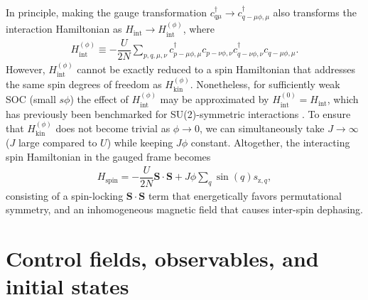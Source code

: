 \documentclass[nofootinbib,twocolumn]{revtex4-2}
\renewcommand{\t}{\text} %
\newcommand{\f}[2]{\dfrac{#1}{#2}} %
\newcommand{\p}[1]{\left(#1\right)} %
\renewcommand{\v}{\bm} %
\renewcommand{\c}{\cdot} %
\newcommand{\1}{\mathds{1}}
\newcommand{\z}{\text{z}}
\begin{document}
In principle, making the gauge transformation $c_{q\mu}^\dag\to c_{q-\mu\phi,\mu}^\dag$ also transforms the interaction Hamiltonian as $H_{\t{int}} \to H_{\t{int}}^{(\phi)}$, where
\begin{align}
  H_{\t{int}}^{(\phi)}
  \equiv -\f{U}{2N} \sum_{p,q,\mu,\nu}
  c_{p-\mu\phi,\mu}^\dag c_{p-\nu\phi,\nu}
  c_{q-\nu\phi,\nu}^\dag c_{q-\mu\phi,\mu}.
\end{align}
However, $H_{\t{int}}^{(\phi)}$ cannot be exactly reduced to a spin Hamiltonian that addresses the same spin degrees of freedom as $H_{\t{kin}}^{(\phi)}$.
Nonetheless, for sufficiently weak SOC (small $s\phi$) the effect of $H_{\t{int}}^{(\phi)}$ may be approximated by $H_{\t{int}}^{(0)}=H_{\t{int}}$, which has previously been benchmarked for SU(2)-symmetric interactions \cite{he2019engineering, smale2019observation}.
To ensure that $H_{\t{kin}}^{(\phi)}$ does not become trivial as $\phi\to0$, we can simultaneously take $J\to\infty$ ($J$ large compared to $U$) while keeping $J\phi$ constant.
Altogether, the interacting spin Hamiltonian in the gauged frame becomes
\begin{align}
  H_{\t{spin}} = -\f{U}{2N} \v S\c\v S + J\phi \sum_q \sin\p{q} s_{\z,q},
  \label{eq:H_spin}
\end{align}
consisting of a spin-locking $\v S\c\v S$ term that energetically favors permutational symmetry, and an inhomogeneous magnetic field that causes inter-spin dephasing.

\section{Control fields, observables, and initial states}
\label{sec:controls}
\end{document}

